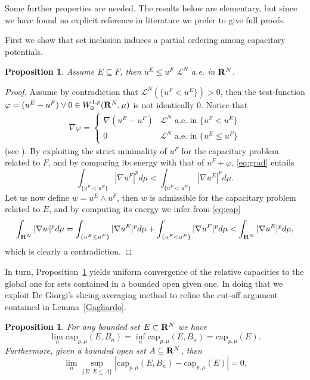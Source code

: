 \documentclass[10pt,reqno]{amsart}
\numberwithin{equation}{section}
\def\L{{\mathcal L}}
\def\R{{\bf R}}
\def\Wspo{W_0^{1,p}}
\def\capmu{\mathrm{cap}_{p,\mu}}
\newtheorem{proposition}[theorem]{Proposition}
\begin{document}
Some further properties are needed. The results below are elementary,
but since we have found no explicit reference in literature we
prefer to give full proofs.

First we show that set inclusion induces a partial ordering
among capacitary potentials.
\begin{proposition}\label{cappotential}
 Assume $E\subseteq F$, then $u^E\leq u^F$ $\L^N$ a.e. in $\R^N$.
\end{proposition}
\begin{proof}
Assume by contradiction that $\L^N(\{u^F<u^E\})>0$, then the test-function
$\varphi=(u^E-u^F)\vee 0\in \Wspo(\R^N,\mu)$ is not identically $0$.
Notice that
\begin{eqnarray}\label{eq:grad}
\nabla\varphi=
  \begin{cases}
  \nabla(u^E-u^F) & \L^N \text{ a.e. in } \{u^F<u^E\} \\
0 & \L^N \text{ a.e. in } \{u^E\leq u^F\} %
  \end{cases}
\end{eqnarray}
(see \cite[Theorem 1.20]{HKM}).
By exploiting the strict minimality of $u^F$ for the capacitary
problem related to $F$, and by comparing its energy with that of
$u^F+\varphi$, \eqref{eq:grad} entails
\begin{equation}
  \label{eq:cap}
\int_{\{u^F<u^E\}}|\nabla u^F|^pd\mu<\int_{\{u^F<u^E\}}|\nabla u^E|^pd\mu.
\end{equation}
Let us now define $w=u^E\wedge u^F$, then $w$ is admissible for the
capacitary problem related to $E$, and by computing its energy
we infer from \eqref{eq:cap}
\begin{eqnarray*}
\int_{\R^N}|\nabla w|^pd\mu=
\int_{\{u^E\leq u^F\}}|\nabla u^E|^pd\mu+
\int_{\{u^F<u^E\}}|\nabla u^F|^pd\mu
<\int_{\R^N}|\nabla u^E|^pd\mu,
\end{eqnarray*}
which is clearly a contradiction.
\end{proof}
In turn, Proposition~\ref{cappotential} yields uniform convergence
of the relative capacities to the global one for sets contained in a
bounded open given one.
In doing that we exploit De Giorgi's slicing-averaging method to refine
the cut-off argument contained in Lemma~\ref{Gagliardo}.
\begin{proposition}\label{cap-prop}
For any bounded set $E\subset\R^N$ we have
\begin{equation}
  \label{eq:rel-cap-conv}
  \lim_n\capmu(E,B_n)=\inf_n\capmu(E,B_n)=\capmu(E).
\end{equation}
Furthermore, given a bounded open set $A\subseteq\R^N$, then
  \begin{equation}
    \label{eq:rel-cap-unif}
  \lim_n\sup_{\{E:\,E\subseteq A\}}|\capmu(E,B_n)-\capmu(E)|=0.
  \end{equation}
\end{proposition}
\end{document}
